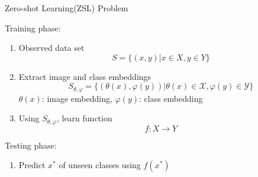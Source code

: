\documentclass[mathserif, xcolor=table]{beamer}
\def\X{\mathcal{X}}
\def\Y{\mathcal{Y}}
\def\X{\mathcal{X}}
\def\Y{\mathcal{Y}}
\begin{document}
\begin{frame}{Zero-shot Learning(ZSL) Problem}

Training phase: 
\begin{enumerate}
\item{Observed data set} 
\begin{equation*}
S = \{(x, y)| x \in X, y \in Y \}
\end{equation*}

\item{Extract image and class embeddings} 
\begin{equation*}
S_{\theta, \varphi} = \{(\theta(x), \varphi(y))| \theta(x) \in \X, \varphi(y) \in \Y \}
\end{equation*}
$\theta(x)$: image embedding, $\varphi(y)$: class embedding
\pause
\item{Using $S_{\theta, \varphi} $, learn function}
\begin{equation*}
f: X \rightarrow Y
\end{equation*}

\end{enumerate}
\pause

Testing phase: 
\begin{enumerate}
\item{Predict $x^*$ of unseen classes using $f(x^*)$} 

\end{enumerate}

\end{frame}

\end{document}
